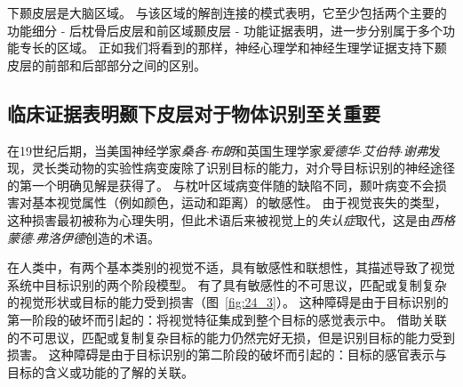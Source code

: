 下颞皮层是大脑区域。
与该区域的解剖连接的模式表明，它至少包括两个主要的功能细分 - 后枕骨后皮层和前区域颞皮层 - 功能证据表明，进一步分别属于多个功能专长的区域。
正如我们将看到的那样，神经心理学和神经生理学证据支持下颞皮层的前部和后部部分之间的区别。



\subsection{临床证据表明颞下皮层对于物体识别至关重要}

在19世纪后期，当美国神经学家\textit{桑各$\cdot$布朗}和英国生理学家\textit{爱德华$\cdot$艾伯特$\cdot$谢弗}发现，灵长类动物的实验性病变废除了识别目标的能力，对介导目标识别的神经途径的第一个明确见解是获得了。
与枕叶区域病变伴随的缺陷不同，颞叶病变不会损害对基本视觉属性（例如颜色，运动和距离）的敏感性。
由于视觉丧失的类型，这种损害最初被称为心理失明，但此术语后来被视觉上的\textit{失认症}取代，这是由\textit{西格蒙德$\cdot$弗洛伊德}创造的术语。


在人类中，有两个基本类别的视觉不适，具有敏感性和联想性，其描述导致了视觉系统中目标识别的两个阶段模型。
有了具有敏感性的不可思议，匹配或复制复杂的视觉形状或目标的能力受到损害（图~\ref{fig:24_3}）。
这种障碍是由于目标识别的第一阶段的破坏而引起的：将视觉特征集成到整个目标的感觉表示中。
借助关联的不可思议，匹配或复制复杂目标的能力仍然完好无损，但是识别目标的能力受到损害。
这种障碍是由于目标识别的第二阶段的破坏而引起的：目标的感官表示与目标的含义或功能的了解的关联。



